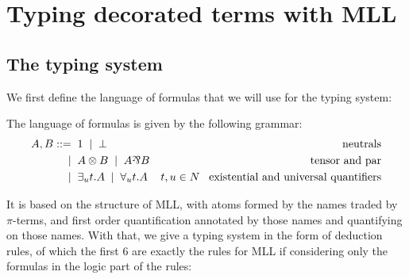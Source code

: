 \section{Typing decorated terms with MLL}

\subsection{The typing system}

We first define the language of formulas that we will use for the typing system:
\begin{definition}
The language of formulas is given by the following grammar:
\begin{align*}
A,B::=	&\;\; 1 \;\; | \;\; \bot							& \text{neutrals}\\
	|	&\;\; A \logtensor B \;\; | \;\; A \logpar B		& \text{tensor and par}\\
	|	&\;\; \exists_ut.A \;\; | \;\; \forall_ut.A		& t,u\in N\;\;\; \text{existential and universal quantifiers}
\end{align*}
\end{definition}

It is based on the structure of MLL, with atoms formed by the names traded by $\pi$-terms, and first order quantification annotated by those names and quantifying on those names. With that, we give a typing system in the form of deduction rules, of which the first 6 are exactly the rules for MLL if considering only the formulas in the logic part of the rules: 

